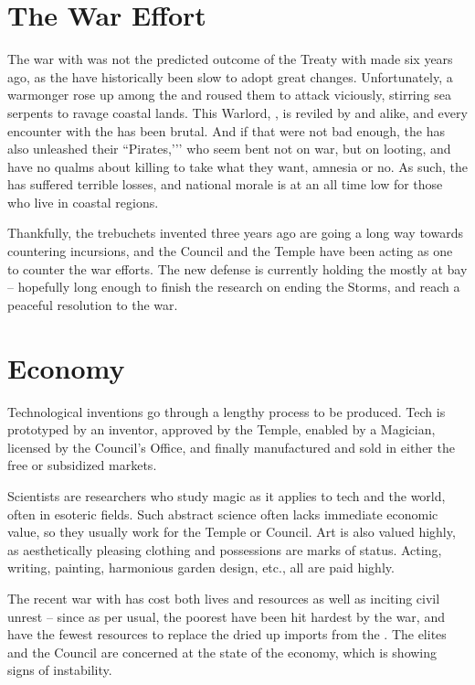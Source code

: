 \documentclass[blue]{GL2020}
\begin{document}
\section*{The War Effort}
The war with \pShip{} was not the predicted outcome of the Treaty with \pFarm{} made six years ago, as the \pShippies{} have historically been slow to adopt great changes. Unfortunately, a warmonger rose up among the \pShippies{} and roused them to attack viciously, stirring sea serpents to ravage coastal lands. This Warlord, \cLoud{\full}, is reviled by \pTechies{} and \pFarm{} alike, and every encounter with the \pShippies{} has been brutal. And if that were not bad enough, the \pShip{} has also unleashed their ``Pirates,’’’ who seem bent not on war, but on looting, and have no qualms about killing to take what they want, amnesia or no. As such, the \pTech{} has suffered terrible losses, and national morale is at an all time low for those who live in coastal regions. 

Thankfully, the trebuchets invented three years ago are going a long way towards countering \pShip{} incursions, and the Council and the Temple have been acting as one to counter the \pShip{} war efforts. The new defense is currently holding the \pShip{} mostly at bay -- hopefully long enough to finish the research on ending the Storms, and reach a peaceful resolution to the war.
	
\section*{Economy}
Technological inventions go through a lengthy process to be produced. Tech is prototyped by an inventor, approved by the Temple, enabled by a Magician, licensed by the Council’s Office, and finally manufactured and sold in either the free or subsidized markets. 

Scientists are researchers who study magic as it applies to tech and the world, often in esoteric fields. Such abstract science often lacks immediate economic value, so they usually work for the Temple or Council. Art is also valued highly, as aesthetically pleasing clothing and possessions are marks of status. Acting, writing, painting, harmonious garden design, etc., all are paid highly.  

The recent war with \pShip{} has cost both lives and resources as well as inciting civil unrest -- since as per usual, the poorest have been hit hardest by the war, and have the fewest resources to replace the dried up imports from the \pShippies{}. The elites and the Council are concerned at the state of the economy, which is showing signs of instability.
\end{document}
